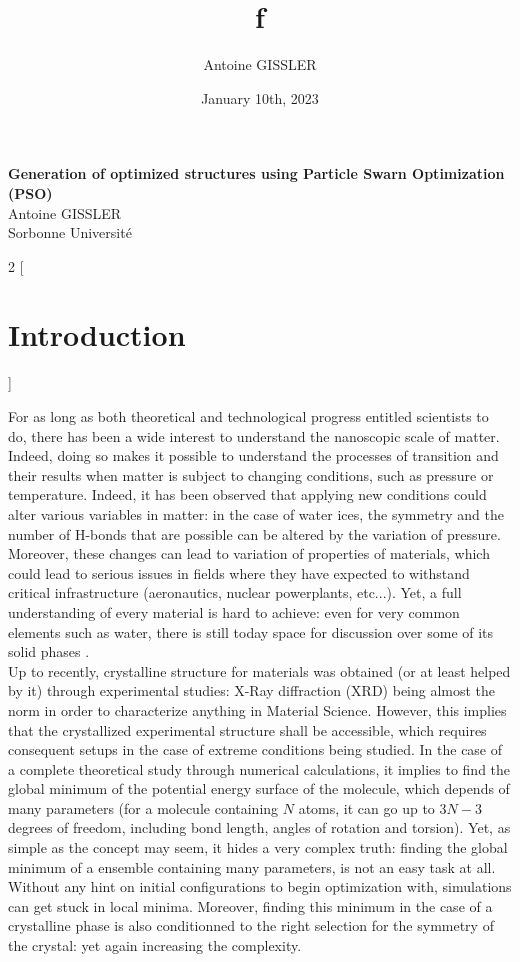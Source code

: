 \documentclass[11pt]{article}
\title{\textsf{\textbf{f}}}
\author{Antoine GISSLER}
\date{January 10th, 2023}
\begin{document}
\noindent\huge\textbf{\textsf{Generation of optimized structures using Particle Swarn Optimization (PSO)}}\normalsize\vspace{1em}\\
\large \textsf{Antoine GISSLER\\Sorbonne Université}
\begin{multicols}{2}
[
\section{Introduction}
]

For as long as both theoretical and technological progress entitled scientists to do, there has been a wide interest to understand the nanoscopic scale of matter. Indeed, doing so makes it possible to understand the processes of transition and their results when matter is subject to changing conditions, such as pressure or temperature. Indeed, it has been observed that applying new conditions could alter various variables in matter: in the case of water ices, the symmetry and the number of H-bonds that are possible can be altered by the variation of pressure. Moreover, these changes can lead to variation of properties of materials, which could lead to serious issues in fields where they have expected to withstand critical infrastructure (aeronautics, nuclear powerplants, etc...). Yet, a full understanding of every material is hard to achieve: even for very common elements such as water, there is still today space for discussion over some of its solid phases \cite{Hansen2021-bk}. \\
Up to recently, crystalline structure for materials was obtained (or at least helped by it) through experimental studies: X-Ray diffraction (XRD) being almost the norm in order to characterize anything in Material Science. However, this implies that the crystallized experimental structure shall be accessible, which requires consequent setups in the case of extreme conditions being studied. In the case of a complete theoretical study through numerical calculations, it implies to find the global minimum of the potential energy surface of the molecule, which depends of many parameters (for a molecule containing $N$ atoms, it can go up to $3N-3$ degrees of freedom, including bond length, angles of rotation and torsion). Yet, as simple as the concept may seem, it hides a very complex truth: finding the global minimum of a ensemble containing many parameters, is not an easy task at all. Without any hint on initial configurations to begin optimization with, simulations can get stuck in local minima. Moreover, finding this minimum in the case of a crystalline phase is also conditionned to the right selection for the symmetry of the crystal: yet again increasing the complexity.\vspace{1em}


\end{multicols}
\end{document}
